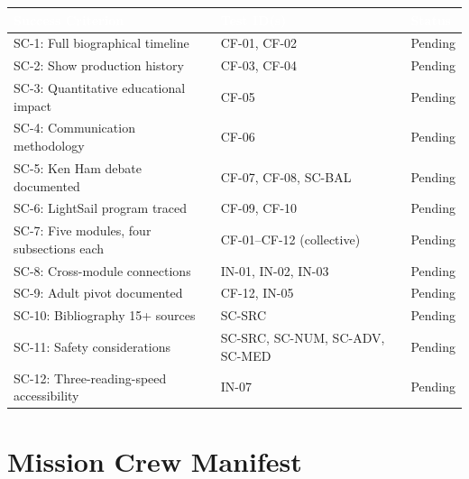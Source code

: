 \documentclass[11pt,letterpaper]{article}
\newcommand{\tableheader}[1]{\textbf{\sffamily\textcolor{white}{#1}}}
\begin{document}
\begin{center}
\begin{tabularx}{\textwidth}{XL{3.5cm}C{1.5cm}}
\toprule
{}
\tableheader{Success Criterion} & \tableheader{Test ID(s)} & \tableheader{Status} \\
\midrule
SC-1: Full biographical timeline & CF-01, CF-02 & Pending \\
SC-2: Show production history & CF-03, CF-04 & Pending \\
SC-3: Quantitative educational impact & CF-05 & Pending \\
SC-4: Communication methodology & CF-06 & Pending \\
SC-5: Ken Ham debate documented & CF-07, CF-08, SC-BAL & Pending \\
SC-6: LightSail program traced & CF-09, CF-10 & Pending \\
SC-7: Five modules, four subsections each & CF-01--CF-12 (collective) & Pending \\
SC-8: Cross-module connections & IN-01, IN-02, IN-03 & Pending \\
SC-9: Adult pivot documented & CF-12, IN-05 & Pending \\
SC-10: Bibliography 15+ sources & SC-SRC & Pending \\
SC-11: Safety considerations & SC-SRC, SC-NUM, SC-ADV, SC-MED & Pending \\
SC-12: Three-reading-speed accessibility & IN-07 & Pending \\
\bottomrule
\end{tabularx}
\end{center}

\section{Mission Crew Manifest}
\end{document}
